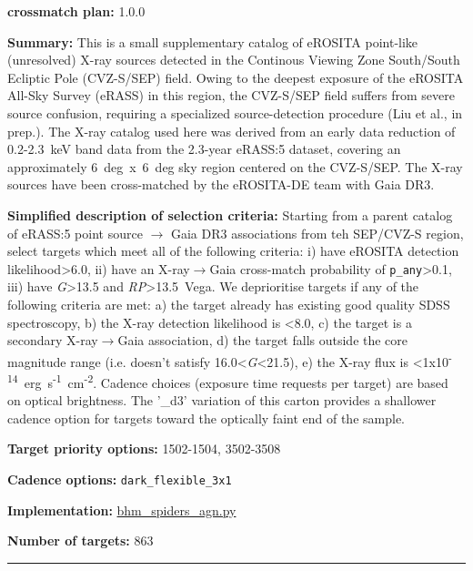 \noindent\textbf{crossmatch plan:} 1.0.0

\noindent\textbf{Summary:} This is a small supplementary catalog of eROSITA
point-like (unresolved) X-ray sources detected in the Continous Viewing
Zone South/South Ecliptic Pole (CVZ-S/SEP) field. Owing to the deepest
exposure of the eROSITA All-Sky Survey (eRASS) in this region, the
CVZ-S/SEP field suffers from severe source confusion, requiring a
specialized source-detection procedure (Liu et al., in prep.). The X-ray
catalog used here was derived from an early data reduction of
0.2-2.3~keV band data from the 2.3-year eRASS:5 dataset, covering an
approximately 6~deg~x~6~deg sky region centered on the CVZ-S/SEP. The
X-ray sources have been cross-matched by the eROSITA-DE team with Gaia
DR3.

\noindent\textbf{Simplified description of selection criteria:} Starting from a
parent catalog of eRASS:5 point source $\rightarrow$ Gaia DR3 associations from teh
SEP/CVZ-S region, select targets which meet all of the following
criteria: i) have eROSITA detection likelihood\textgreater6.0, ii) have
an X-ray$\rightarrow$Gaia cross-match probability of \texttt{p\_any}\textgreater0.1,
iii) have \emph{G}\textgreater13.5 and \emph{RP}\textgreater13.5~Vega.
We deprioritise targets if any of the following criteria are met: a) the
target already has existing good quality SDSS spectroscopy, b) the X-ray
detection likelihood is \textless8.0, c) the target is a secondary
X-ray$\rightarrow$Gaia association, d) the target falls outside the core magnitude
range (i.e. doesn't satisfy 16.0\textless{}\emph{G}\textless21.5), e)
the X-ray flux is
\textless1x10\textsuperscript{-14}~erg~s\textsuperscript{-1}~cm\textsuperscript{-2}.
Cadence choices (exposure time requests per target) are based on optical
brightness. The '\_d3' variation of this carton provides a shallower
cadence option for targets toward the optically faint end of the sample.


\noindent\textbf{Target priority options:} 1502-1504, 3502-3508

\noindent\textbf{Cadence options:} \texttt{dark\_flexible\_3x1}

\noindent\textbf{Implementation:}
\href{https://github.com/sdss/target_selection/blob/1.3.3/python/target_selection/cartons/bhm_spiders_agn.py}{bhm\_spiders\_agn.py}

\noindent\textbf{Number of targets:} 863

\begin{center}\rule{0.5\linewidth}{0.5pt}\end{center}

